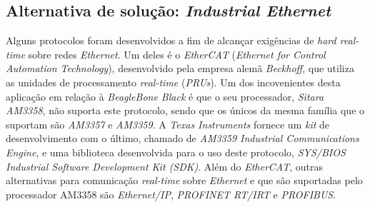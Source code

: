 \subsection{Alternativa de solução: \textit{Industrial Ethernet}}

Alguns protocolos foram desenvolvidos a fim de alcançar exigências de
\textit{hard real-time} sobre redes \textit{Ethernet}. Um deles é o
\textit{EtherCAT} (\textit{Ethernet for Control Automation Technology}),
desenvolvido pela empresa alemã \textit{Beckhoff}, que utiliza as unidades de
processamento \textit{real-time} (\textit{PRUs}). Um dos incovenientes desta
aplicação em relação à \textit{BeagleBone Black} é que o seu processador,
\textit{Sitara AM3358}, não suporta este protocolo, sendo que os únicos da mesma
família que o suportam são \textit{AM3357} e \textit{AM3359}. A \textit{Texas
Instruments} fornece um \textit{kit} de desenvolvimento com o último, chamado de
\textit{AM3359 Industrial Communications Engine}, e uma biblioteca desenvolvida
para o uso deste protocolo, \textit{SYS/BIOS Industrial Software Development Kit
(SDK)}. Além do \textit{EtherCAT}, outras alternativas para comunicação
\textit{real-time} sobre \textit{Ethernet} e que são suportadas pelo processador
AM3358 são \textit{Ethernet/IP}, \textit{PROFINET RT/IRT} e \textit{PROFIBUS}.
